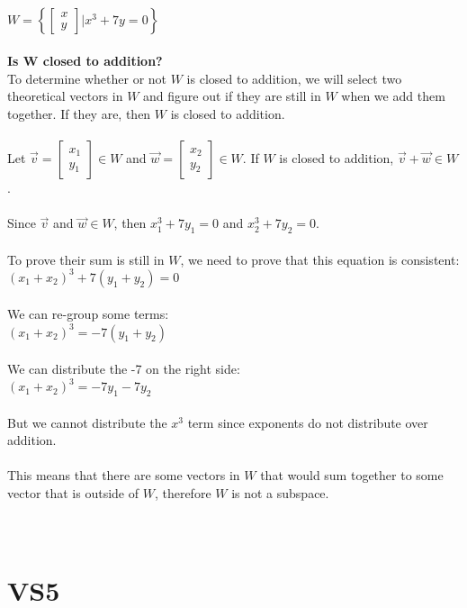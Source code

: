 \documentclass{article}
\begin{document}
\\
\newpage
\noindent $W = \left\{ \left[ 
\begin{matrix} x \\ y \end{matrix} 
\right] \Bigg|  x^{3}+7y=0  \right\}$\\
\\
\textbf{Is W closed to addition?}
\\
To determine whether or not $W$ is closed to addition, we will select two theoretical vectors in $W$ and figure out if they are still in $W$ when we add them together. If they are, then $W$ is closed to addition.\\
\\
Let 
$\vec{v} = \left[\begin{matrix}x_{1}\\y_{1}\end{matrix}\right] \in W$ and 
$\vec{w} = \left[\begin{matrix}x_{2}\\y_{2}\end{matrix}\right] \in W$. If $W$ is closed to addition, $\vec{v} + \vec{w} \in W$.\\
\\
Since $\vec{v}$ and $\vec{w} \in W$, then $x_{1}^{3} + 7y_{1} = 0$ and $x_{2}^{3} + 7y_{2} = 0$.\\
\\
To prove their sum is still in $W$, we need to prove that this equation is consistent: $(x_{1} + x_{2})^{3} + 7(y_{1} + y_{2}) = 0$\\
\\
We can re-group some terms:\\
$(x_{1} + x_{2})^{3} = -7(y_{1} + y_{2})$\\
\\
We can distribute the -7 on the right side:\\
$(x_{1} + x_{2})^{3} = -7y_{1} - 7y_{2}$\\
\\
But we cannot distribute the $x^{3}$ term since exponents do not distribute over addition.\\
\\
This means that there are some vectors in $W$ that would sum together to some vector that is outside of $W$, therefore $W$ is not a subspace. \\
\\
\\
\newpage
\section{VS5}\\
\end{document}
